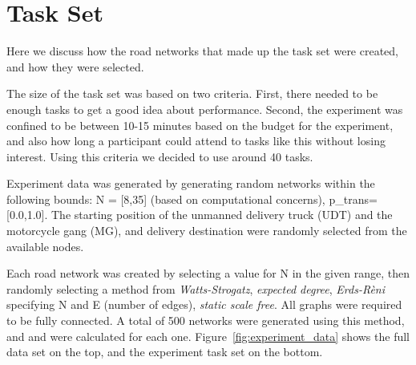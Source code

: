\section{Task Set}
Here we discuss how the road networks that made up the task set were created, and how they were selected.

The size of the task set was based on two criteria. First, there needed to be enough tasks to get a good idea about performance. Second, the experiment was confined to be between 10-15 minutes based on the budget for the experiment, and also how long a participant could attend to tasks like this without losing interest. Using this criteria we decided to use around 40 tasks.

Experiment data was generated by generating random networks within the following bounds: N = [8,35] (based on computational concerns), p_trans=[0.0,1.0]. The starting position of the unmanned delivery truck (UDT) and the motorcycle gang (MG), and delivery destination were randomly selected from the available nodes.

Each road network was created by selecting a value for N in the given range, then randomly selecting a method from \emph{Watts-Strogatz}, \emph{expected degree}, \emph{Erds-R\`{e}ni} specifying N and E (number of edges), \emph{static scale free}. All graphs were required to be fully connected. A total of 500 networks were generated using this method, and \xQ{} and \xO{} were calculated for each one. Figure~\ref{fig:experiment_data} shows the full data set on the top, and the experiment task set on the bottom.

